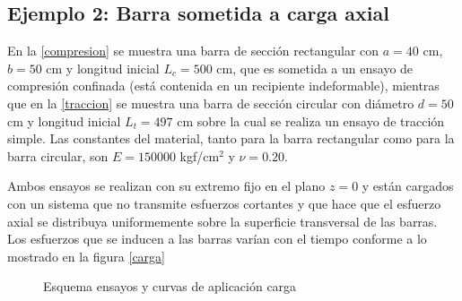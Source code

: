 \documentclass[../notas medios.tex]{subfiles}
\begin{document}
\subsection*{Ejemplo 2: Barra sometida a carga axial}

En la \cref{compresion} se muestra una barra de sección rectangular con $a= 40$ cm, $b = 50$ cm y longitud inicial $L_{c} = 500$ cm, que es  sometida a un ensayo de compresión confinada (está contenida en un recipiente indeformable), mientras que en la \cref{traccion}  se muestra una barra de sección circular con diámetro $d = 50$ cm y longitud inicial $L_{t} = 497$ cm sobre la cual se realiza  un ensayo de tracción simple. Las constantes del material, tanto para la barra rectangular como para la barra circular, son $E=150000$ kgf/cm$^2$ y $\nu=0.20$.

Ambos ensayos se realizan con su extremo fijo  en el plano $z = 0$ y están cargados con un sistema que no transmite esfuerzos cortantes y que hace que el esfuerzo axial se distribuya uniformemente sobre la superficie transversal de las barras. Los esfuerzos que se inducen a las barras varían con el tiempo conforme a lo mostrado en la figura \cref{carga}
\begin{figure}[H]
	\centering
	\caption{Esquema ensayos y curvas de aplicación carga}
	\label{ensayo}
\end{figure}
\end{document}
